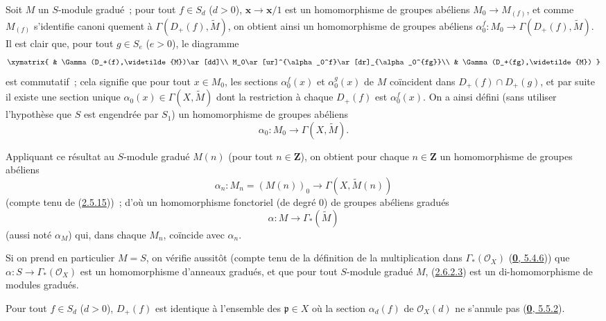 \begin{env}[2.6.2]
\label{II.2.6.2-fr}
Soit $M$ un $S$-module gradué~; pour tout $f\in S_d$ ($d>0$),
$\boldsymbol{x}\to\boldsymbol{x}/1$ est un homomorphisme de groupes abéliens
$M_0\to M_{(f)}$, et comme $M_{(f)}$ s'identifie canoni%
quement à $\Gamma(D_+(f),\widetilde{M})$, on obtient ainsi un
homomorphisme de groupes abéliens
$\alpha_0^f:M_0\to\Gamma(D_+(f),\widetilde{M})$.
Il est clair que, pour tout $g\in S_e$ ($e>0$), le diagramme
\[
  \xymatrix{
    & \Gamma(D_+(f),\widetilde{M})\ar[dd]\\
    M_0\ar[ur]^{\alpha_0^f}\ar[dr]_{\alpha_0^{fg}}\\
    & \Gamma(D_+(fg),\widetilde{M})
  }
\]
est commutatif~; cela signifie que pour tout $x\in M_0$, les sections
$\alpha_0^f(x)$ et $\alpha_0^g(x)$ de $M$ coïncident dans
$D_+(f)\cap D_+(g)$, et par suite il existe une section unique
$\alpha_0(x)\in\Gamma(X,\widetilde{M})$ dont la restriction à chaque
$D_+(f)$ est $\alpha_0^f(x)$. On a ainsi défini (sans utiliser l'hypothèse
que $S$ est engendrée par $S_1$) un homomorphisme de groupes abéliens
\[
\label{II.2.6.2.1-fr}
  \alpha_0:M_0\longrightarrow\Gamma(X,\widetilde{M}).
\tag{2.6.2.1}
\]

Appliquant ce résultat au $S$-module gradué $M(n)$ (pour tout
$n\in\mathbf{Z}$), on obtient pour chaque $n\in\mathbf{Z}$ un homomorphisme
de groupes abéliens
\[
\label{II.2.6.2.2-fr}
  \alpha_n:M_n=(M(n))_0\longrightarrow\Gamma(X,\widetilde{M}(n))
\tag{2.6.2.2}
\]
(compte tenu de (\hyperref[II.2.5.15-fr]{2.5.15}))~; d'où un homomorphisme
fonctoriel (de degré $0$) de groupes abéliens gradués
\[
\label{II.2.6.2.3-fr}
  \alpha:M\longrightarrow\Gamma_*(\widetilde{M})
\tag{2.6.2.3}
\]
(aussi noté $\alpha_M$) qui, dans chaque $M_n$, coïncide avec $\alpha_n$.

Si on prend en particulier $M=S$, on vérifie aussitôt (compte tenu de la
définition de la multiplication dans $\Gamma_*(\mathcal{O}_X)$
(\hyperref[0.5.4.6-fr]{\textbf{0}, 5.4.6})) que
$\alpha:S\to\Gamma_*(\mathcal{O}_X)$ est un homomorphisme d'anneaux
gradués, et que pour tout $S$-module gradué $M$,
(\hyperref[II.2.6.2.3-fr]{2.6.2.3}) est un di-homomorphisme de modules
gradués.
\end{env}

\begin{proposition}[2.6.3]
\label{II.2.6.3-fr}
Pour tout $f\in S_d$ ($d>0$), $D_+(f)$ est identique à l'ensemble des
$\mathfrak{p}\in X$ où la section $\alpha_d(f)$ de $\mathcal{O}_X(d)$ ne
s'annule pas \textup{(\hyperref[0.5.5.2-fr]{\textbf{0}, 5.5.2})}.
\end{proposition}

